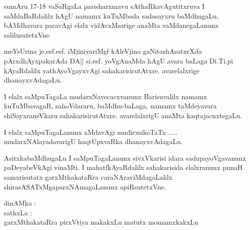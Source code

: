 sumAru 17-18 vaSaRgaLa parisharxmavu sAthaRkavAgutitxruva I saMdaBaRdalilx hAgU namamx kuTuMbada sadasayxru baMdhugaLu, bAMdhavara paravAgi elalx vidAvxMsarige anaMta vaMdanegaLanunx salilxsutetxVne. 

meYsUrina je.esf.esf. iMjiniyariMgf kAleVjina gaNitashAsatxrXda pArxdhAyxpakarAda DA|| si.esf. yoVgAnaMda hAgU avara baLaga Di.Ti.pi kAyaRdalilx yathAyoVgayxvAgi sahakarisirutAtxre. avarelalxrige dhanayxvAdagaLu. 

I elalx saMpuTagaLa mudarxNavecacxvanunx Barisuvalilx namamx kuTuMbavagaR, sahoVdararu, baMdhu-baLaga, namamx taMdeyavara shiSayxraneVkaru sahakarisirutAtxre. avarelalxrigU anaMta kaqtajacnxtegaLu. 

I elalx saMpuTagaLanunx aMdavAgi mudirxsikoTaTx ..... mudarxNAlayadavarigU haqtUpxvaRka dhanayxvAdagaLu.

AsitxkabaMdhugaLu I saMpuTagaLanunx sivxVkarisi idara sadupayoVgavanunx paDeyabeVkAgi vinaMti. I mahatfkAyaRdalilx sahakarisida elalxranunx punaH samxrisutatx garxMthakataRra caraNAraviMdagaLalilx shirasASATxMgaparxNAmagaLanunx apiRsutetxVne.

\bigskip

\noindent dinAMka : \\
sathxLa : \\
garxMthakataRra pirxVtiya makakxLu matutx momamxkakxLu
